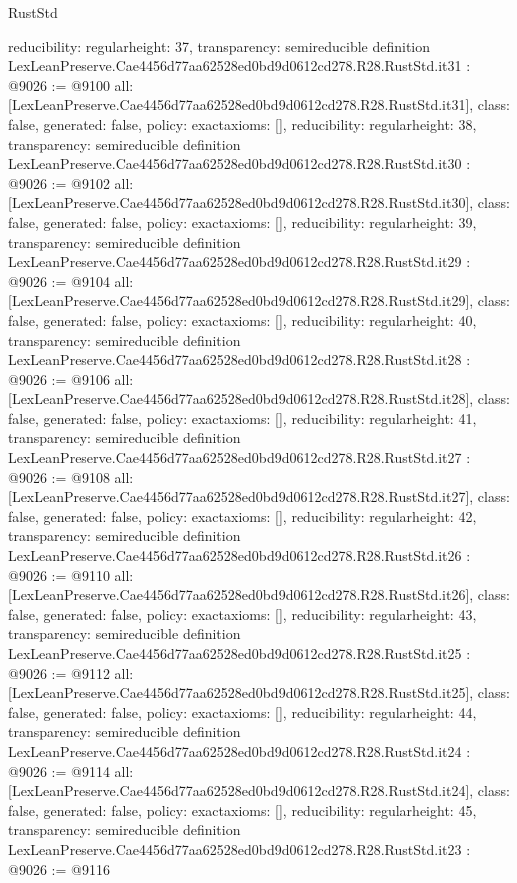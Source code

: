 \begin{lexlean}{RustStd}
\begin{coremodule}
{  reducibility: regular{height: 37},
  transparency: semireducible
}
definition LexLeanPreserve.Cae4456d77aa62528ed0bd9d0612cd278.R28.RustStd.it31 : @9026 := @9100 {
  all: [LexLeanPreserve.Cae4456d77aa62528ed0bd9d0612cd278.R28.RustStd.it31],
  class: false,
  generated: false,
  policy: exact{axioms: []},
  reducibility: regular{height: 38},
  transparency: semireducible
}
definition LexLeanPreserve.Cae4456d77aa62528ed0bd9d0612cd278.R28.RustStd.it30 : @9026 := @9102 {
  all: [LexLeanPreserve.Cae4456d77aa62528ed0bd9d0612cd278.R28.RustStd.it30],
  class: false,
  generated: false,
  policy: exact{axioms: []},
  reducibility: regular{height: 39},
  transparency: semireducible
}
definition LexLeanPreserve.Cae4456d77aa62528ed0bd9d0612cd278.R28.RustStd.it29 : @9026 := @9104 {
  all: [LexLeanPreserve.Cae4456d77aa62528ed0bd9d0612cd278.R28.RustStd.it29],
  class: false,
  generated: false,
  policy: exact{axioms: []},
  reducibility: regular{height: 40},
  transparency: semireducible
}
definition LexLeanPreserve.Cae4456d77aa62528ed0bd9d0612cd278.R28.RustStd.it28 : @9026 := @9106 {
  all: [LexLeanPreserve.Cae4456d77aa62528ed0bd9d0612cd278.R28.RustStd.it28],
  class: false,
  generated: false,
  policy: exact{axioms: []},
  reducibility: regular{height: 41},
  transparency: semireducible
}
definition LexLeanPreserve.Cae4456d77aa62528ed0bd9d0612cd278.R28.RustStd.it27 : @9026 := @9108 {
  all: [LexLeanPreserve.Cae4456d77aa62528ed0bd9d0612cd278.R28.RustStd.it27],
  class: false,
  generated: false,
  policy: exact{axioms: []},
  reducibility: regular{height: 42},
  transparency: semireducible
}
definition LexLeanPreserve.Cae4456d77aa62528ed0bd9d0612cd278.R28.RustStd.it26 : @9026 := @9110 {
  all: [LexLeanPreserve.Cae4456d77aa62528ed0bd9d0612cd278.R28.RustStd.it26],
  class: false,
  generated: false,
  policy: exact{axioms: []},
  reducibility: regular{height: 43},
  transparency: semireducible
}
definition LexLeanPreserve.Cae4456d77aa62528ed0bd9d0612cd278.R28.RustStd.it25 : @9026 := @9112 {
  all: [LexLeanPreserve.Cae4456d77aa62528ed0bd9d0612cd278.R28.RustStd.it25],
  class: false,
  generated: false,
  policy: exact{axioms: []},
  reducibility: regular{height: 44},
  transparency: semireducible
}
definition LexLeanPreserve.Cae4456d77aa62528ed0bd9d0612cd278.R28.RustStd.it24 : @9026 := @9114 {
  all: [LexLeanPreserve.Cae4456d77aa62528ed0bd9d0612cd278.R28.RustStd.it24],
  class: false,
  generated: false,
  policy: exact{axioms: []},
  reducibility: regular{height: 45},
  transparency: semireducible
}
definition LexLeanPreserve.Cae4456d77aa62528ed0bd9d0612cd278.R28.RustStd.it23 : @9026 := @9116 {
}
\end{coremodule}
\end{lexlean}
